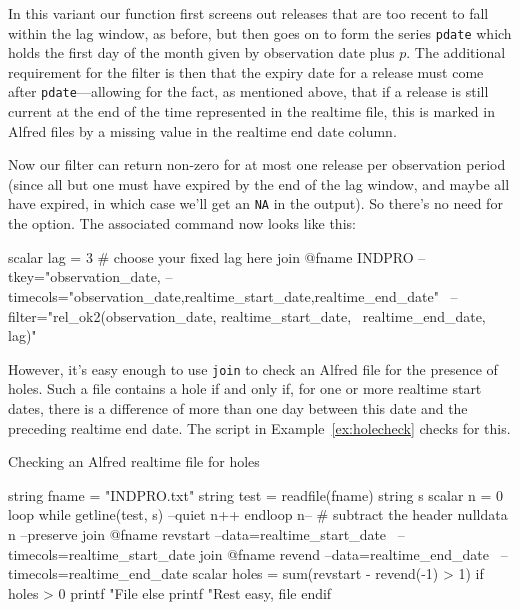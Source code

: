 In this variant our function first screens out releases that are too
recent to fall within the lag window, as before, but then goes on to
form the series \texttt{pdate} which holds the first day of the month
given by observation date plus $p$. The additional requirement for the
filter is then that the expiry date for a release must come after
\texttt{pdate}---allowing for the fact, as mentioned above, that if a
release is still current at the end of the time represented in the
realtime file, this is marked in Alfred files by a missing value in
the realtime end date column.

Now our filter can return non-zero for at most one release per
observation period (since all but one must have expired by the end of
the lag window, and maybe all have expired, in which case we'll get an
\texttt{NA} in the output). So there's no need for the 
option. The associated command now looks like this:

\begin{code}
scalar lag = 3  # choose your fixed lag here
join @fname INDPRO --tkey="observation_date,%
--timecols="observation_date,realtime_start_date,realtime_end_date" \
--filter="rel_ok2(observation_date, realtime_start_date, \
 realtime_end_date, lag)"
\end{code}

However, it's easy enough to use \texttt{join} to check an Alfred file
for the presence of holes. Such a file contains a hole if and only if,
for one or more realtime start dates, there is a difference of more
than one day between this date and the preceding realtime end
date. The script in Example~\ref{ex:holecheck} checks for this.

\begin{script}[htbp]
  \caption{Checking an Alfred realtime file for holes}
  \label{ex:holecheck}
\begin{scode}
string fname = "INDPRO.txt"
string test = readfile(fname)
string s
scalar n = 0
loop while getline(test, s) --quiet
  n++
endloop
n-- # subtract the header
nulldata n --preserve
join @fname revstart --data=realtime_start_date \
 --timecols=realtime_start_date
join @fname revend --data=realtime_end_date \
 --timecols=realtime_end_date
scalar holes = sum(revstart - revend(-1) > 1)
if holes > 0
  printf "File %
else
  printf "Rest easy, file %
endif
\end{scode}
\end{script}

